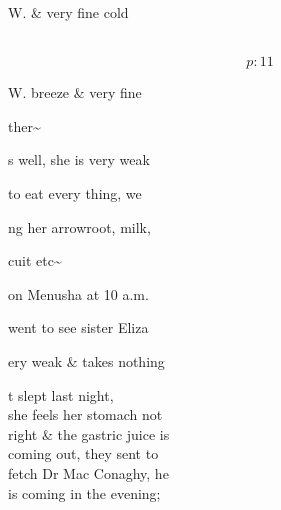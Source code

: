 \documentclass{report}
\begin{document}
	\par{
 	W. \& very fine cold\ \\
	}

	\par{
 	\ \\
  \[p: 11 \]

	}







	\par{
 	W. breeze \& very fine\ \\
	}

	\par{
 	ther\~{}\ \\
	}

	\par{
 	s well, she is very weak\ \\
	}

	\par{
 	to eat every thing, we\ \\
	}

	\par{
 	ng her arrowroot, milk,\ \\
	}

	\par{
 	cuit etc\~{}\ \\
	}

	\par{
 	on Menusha at 10 a.m.\ \\
	}

	\par{
 	went to see sister Eliza\ \\
	}

	\par{
 	ery weak \& takes nothing\ \\
	}

	\par{
 	t slept last night,\ \\she feels her stomach not\ \\right \& the gastric juice is\ \\coming out, they sent to\ \\fetch Dr Mac Conaghy, he\ \\is coming in the evening;\ \\
	}
\end{document}
